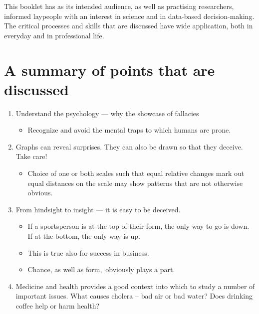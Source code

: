 \documentclass[
  10pt,
  b5paper]{book}
\providecommand{\tightlist}{%
  \setlength{\itemsep}{0pt}\setlength{\parskip}{0pt}}
\begin{document}
This booklet has as its intended audience, as well as practising
researchers, informed laypeople with an interest in science and
in data-based decision-making. The critical processes and skills
that are discussed have wide application, both in everyday and
in professional life.

\hypertarget{a-summary-of-points-that-are-discussed}{%
\chapter*{A summary of points that are discussed}\label{a-summary-of-points-that-are-discussed}}

\begin{enumerate}
\def\labelenumi{\arabic{enumi}.}
\tightlist
\item
  Understand the psychology --- why the showcase of fallacies

  \begin{itemize}
  \tightlist
  \item
    Recognize and avoid the mental traps to which humans are prone.
  \end{itemize}
\item
  Graphs can reveal surprises. They can also be drawn
  so that they deceive. Take care!

  \begin{itemize}
  \tightlist
  \item
    Choice of one or both scales such that equal relative
    changes mark out equal distances on the scale may show
    patterns that are not otherwise obvious.
  \end{itemize}
\item
  From hindsight to insight --- it is easy to be deceived.

  \begin{itemize}
  \tightlist
  \item
    If a sportsperson is at the top of their form, the only
    way to go is down. If at the bottom, the only way is up.
  \item
    This is true also for success in business.
  \item
    Chance, as well as form,~obviously plays a part.
  \end{itemize}
\item
  Medicine and health provides a good context into which to study
  a number of important issues. What causes cholera -- bad air or bad water?
  Does drinking coffee help or harm health?


\end{enumerate}
\end{document}
